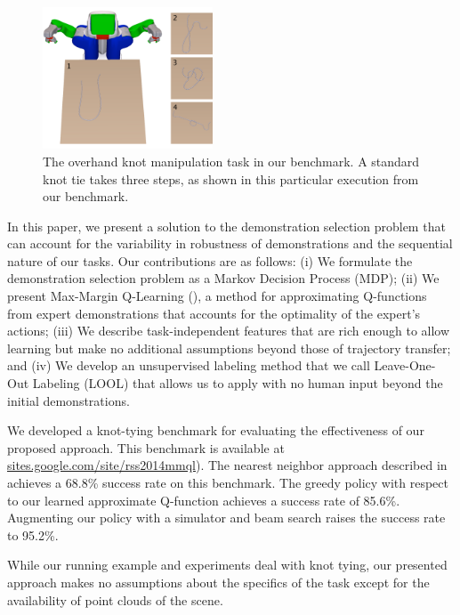\begin{figure}[t]
  \centering
    \noindent
    \includegraphics[width=0.45\textwidth]{figures/knot_steps_num.png}
  \caption{The overhand knot manipulation task in our benchmark.
           A standard knot tie takes three steps, as shown in this
           particular execution from our benchmark.}
  \label{fig:knot_steps}
\end{figure}

In this paper, we present a solution to the demonstration selection problem that
can account for the variability in robustness of demonstrations and the
sequential nature of our tasks. Our contributions are as follows:
(i) We formulate the demonstration selection problem as a Markov Decision
Process (MDP); (ii) We present Max-Margin Q-Learning (\mmql{}), a method for
approximating Q-functions from expert demonstrations that accounts for the
optimality of the expert's actions; (iii) We describe task-independent
features that are rich enough to allow learning but make no additional
assumptions beyond those of trajectory transfer; and (iv) We develop an unsupervised
labeling method that we call Leave-One-Out Labeling (LOOL) that allows
us to apply \mmql{} with no human input beyond the initial demonstrations.

We developed a knot-tying benchmark for evaluating the effectiveness of
our proposed approach.   This benchmark is available at
\href{https://sites.google.com/site/rss2014mmql}{sites.google.com/site/rss2014mmql}). The
nearest neighbor approach described in \citet{Schulmanetal_ISRR2013} achieves a
68.8\% success rate on this benchmark.  The greedy policy with respect to our learned
approximate Q-function achieves a success rate of 85.6\%. Augmenting our
policy with a simulator and beam search raises the success rate to 95.2\%.

While our running example and experiments deal with knot tying, our presented
\mmql{} approach makes no assumptions about the
specifics of the task except for the availability of point clouds of
the scene.
